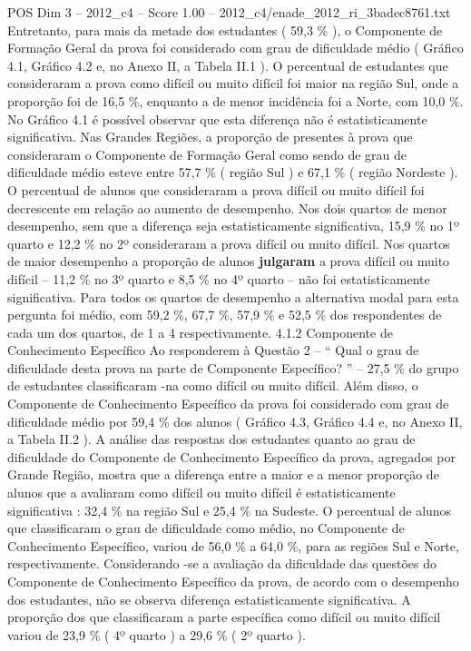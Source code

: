 \begin{textsample}{POS Dim 3 – 2012\_c4 – Score 1.00 – 2012\_c4/enade\_2012\_ri\_3badec8761.txt}
Entretanto, para mais da metade dos estudantes ( 59,3 \% ), o Componente de Formação Geral da prova foi considerado com grau de dificuldade médio ( Gráfico 4.1, Gráfico 4.2 e, no Anexo II, a Tabela II.1 ).
O percentual de estudantes que consideraram a prova como difícil ou muito difícil foi maior na região Sul, onde a proporção foi de 16,5 \%, enquanto a de menor incidência foi a Norte, com 10,0 \%.
No Gráfico 4.1 é possível observar que esta diferença não é estatisticamente significativa.
Nas Grandes Regiões, a proporção de presentes à prova que consideraram o Componente de Formação Geral como sendo de grau de dificuldade médio esteve entre 57,7 \% ( região Sul ) e 67,1 \% ( região Nordeste ).
O percentual de alunos que consideraram a prova difícil ou muito difícil foi decrescente em relação ao aumento de desempenho.
Nos dois quartos de menor desempenho, sem que a diferença seja estatisticamente significativa, 15,9 \% no 1º quarto e 12,2 \% no 2º consideraram a prova difícil ou muito difícil.
Nos quartos de maior desempenho a proporção de alunos \textbf{julgaram} a prova difícil ou muito difícil – 11,2 \% no 3º quarto e 8,5 \% no 4º quarto – não foi estatisticamente significativa.
Para todos os quartos de desempenho a alternativa modal para esta pergunta foi médio, com 59,2 \%, 67,7 \%, 57,9 \% e 52,5 \% dos respondentes de cada um dos quartos, de 1 a 4 respectivamente. 4.1.2 Componente de Conhecimento Específico Ao responderem à Questão 2 – “ Qual o grau de dificuldade desta prova na parte de Componente Específico? ” – 27,5 \% do grupo de estudantes classificaram -na como difícil ou muito difícil.
Além disso, o Componente de Conhecimento Específico da prova foi considerado com grau de dificuldade médio por 59,4 \% dos alunos ( Gráfico 4.3, Gráfico 4.4 e, no Anexo II, a Tabela II.2 ).
A análise das respostas dos estudantes quanto ao grau de dificuldade do Componente de Conhecimento Específico da prova, agregados por Grande Região, mostra que a diferença entre a maior e a menor proporção de alunos que a avaliaram como difícil ou muito difícil é estatisticamente significativa : 32,4 \% na região Sul e 25,4 \% na Sudeste.
O percentual de alunos que classificaram o grau de dificuldade como médio, no Componente de Conhecimento Específico, variou de 56,0 \% a 64,0 \%, para as regiões Sul e Norte, respectivamente.
Considerando -se a avaliação da dificuldade das questões do Componente de Conhecimento Específico da prova, de acordo com o desempenho dos estudantes, não se observa diferença estatisticamente significativa.
A proporção dos que classificaram a parte específica como difícil ou muito difícil variou de 23,9 \% ( 4º quarto ) a 29,6 \% ( 2º quarto ).

\end{textsample}
